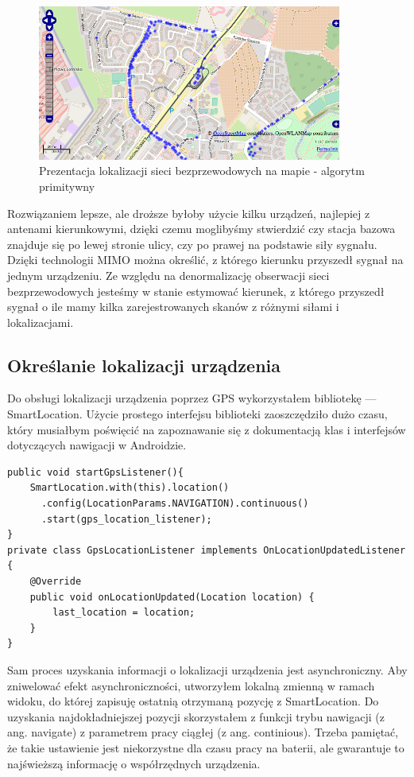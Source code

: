 \begin{figure}[h!]
  \centering
    \includegraphics[width=10cm]{images/poor-scan-result}
  \caption{Prezentacja lokalizacji sieci bezprzewodowych na mapie - algorytm primitywny}
  \label{fig:poor-scan-result}
\end{figure}

Rozwiązaniem lepsze, ale droższe byłoby użycie kilku urządzeń, najlepiej z antenami kierunkowymi, dzięki czemu moglibyśmy stwierdzić czy stacja bazowa znajduje się po lewej stronie ulicy, czy po prawej na podstawie siły sygnału.
Dzięki technologii MIMO można określić, z którego kierunku przyszedł sygnał na jednym urządzeniu. Ze względu na denormalizację obserwacji sieci bezprzewodowych jesteśmy w stanie estymować kierunek, z którego przyszedł sygnał o ile mamy kilka zarejestrowanych skanów z różnymi siłami i lokalizacjami.


\subsection{Określanie lokalizacji urządzenia}
Do obsługi lokalizacji urządzenia poprzez GPS wykorzystałem bibliotekę — SmartLocation. Użycie prostego interfejsu biblioteki zaoszczędziło dużo czasu, który musiałbym poświęcić na zapoznawanie się z dokumentacją klas i interfejsów dotyczących nawigacji w Androidzie.

\begin{verbatim}
public void startGpsListener(){
    SmartLocation.with(this).location()
      .config(LocationParams.NAVIGATION).continuous()
      .start(gps_location_listener);
}
private class GpsLocationListener implements OnLocationUpdatedListener {
    @Override
    public void onLocationUpdated(Location location) {
        last_location = location;
    }
}
\end{verbatim}

Sam proces uzyskania informacji o lokalizacji urządzenia jest asynchroniczny. Aby zniwelować efekt asynchroniczności, utworzyłem lokalną zmienną w ramach widoku, do której zapisuję ostatnią otrzymaną pozycję z SmartLocation. Do uzyskania najdokładniejszej pozycji skorzystałem z funkcji trybu nawigacji (z ang. navigate) z parametrem pracy ciągłej (z ang. continious). Trzeba pamiętać, że takie ustawienie jest niekorzystne dla czasu pracy na baterii, ale gwarantuje to najświeższą informację o współrzędnych urządzenia.

